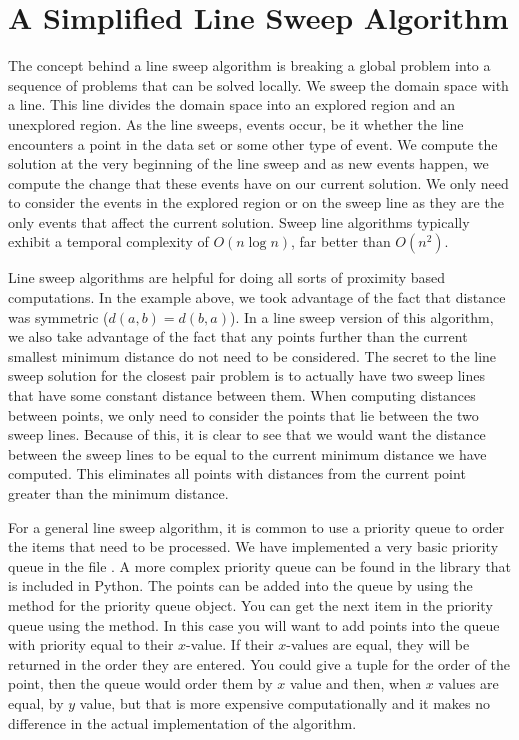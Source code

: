 \section*{A Simplified Line Sweep Algorithm}

The concept behind a line sweep algorithm is breaking a global problem into a sequence of
problems that can be solved locally.  We sweep the domain space with a line.
This line divides the domain space into an explored region and an unexplored region.
As the line sweeps, events occur, be it whether the line encounters a point in the data set
or some other type of event.  We compute the solution at the very beginning of the line sweep
and as new events happen, we compute the change that these events have on our current solution.
We only need to consider the events in the explored region or on the sweep line as they are the
only events that affect the current solution.  Sweep line algorithms typically exhibit a temporal
complexity of $O(n \log n)$, far better than $O(n^2)$.

Line sweep algorithms are helpful for doing all sorts of proximity based computations.
In the example above, we took advantage of the fact that distance was symmetric ($d(a,b)=d(b,a)$).
In a line sweep version of this algorithm, we also take advantage of the fact that any points further
than the current smallest minimum distance do not need to be considered.  The secret to
the line sweep solution for the closest pair problem is to actually have two sweep lines that have
some constant distance between them.  When computing distances between points, we only need to consider
the points that lie between the two sweep lines.  Because of this, it is clear to see that we would want
the distance between the sweep lines to be equal to the current minimum distance we have computed.
This eliminates all points with distances from the current point greater than the minimum distance.

For a general line sweep algorithm, it is common to use a priority queue to order the items that need to be processed.
We have implemented a very basic priority queue in the file . 
A more complex priority queue can be found in the library  that is included in Python. 
The points can be added into the queue by using the  method for the priority queue object. 
You can get the next item in the priority queue using the  method. 
In this case you will want to add points into the queue with priority equal to their $x$-value. 
If their $x$-values are equal, they will be returned in the order they are entered. 
You could give a tuple for the order of the point, then the queue would order them by $x$ value and then, when $x$ values are equal, by $y$ value, but that is more expensive computationally and it makes no difference in the actual implementation of the algorithm. 

